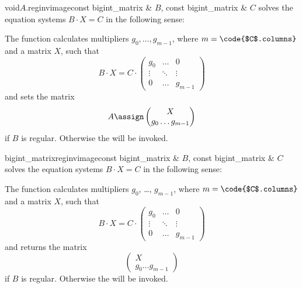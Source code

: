 {\begin{fcode}{void}{$A$.reginvimage}{const bigint_matrix & $B$, const bigint_matrix & $C$}
  solves the equation systems $B \cdot X = C$ in the following sense:

  The function calculates  multipliers $g_0, \dots, g_{m-1}$, where $m =
  \code{$C$.columns}$ and a matrix $X$, such that
  \begin{displaymath}
    B \cdot X = C \cdot \begin{pmatrix}
      g_0 & \dots & 0 \\
      \vdots & \ddots & \vdots \\
      0& \dots & g_{m-1}
    \end{pmatrix}
  \end{displaymath}
  and sets the matrix
  \begin{displaymath}
    A \assign \begin{pmatrix}
      X \\
      g_0 \dots g_{m-1}
    \end{pmatrix}
  \end{displaymath}
  if $B$ is regular.  Otherwise the \LEH will be invoked.
\end{fcode}

\begin{fcode}{bigint_matrix}{reginvimage}{const bigint_matrix & $B$, const bigint_matrix & $C$}
  solves the equation systems $B \cdot X = C$ in the following sense:
  
  The function calculates  multipliers $g_0$, \dots, $g_{m-1}$, where $m =
  \code{$C$.columns}$ and a matrix $X$, such that
  \begin{displaymath}
    B \cdot X = C \cdot \begin{pmatrix}
      g_0 & \dots & 0 \\
      \vdots & \ddots & \vdots \\
      0& \dots & g_{m-1}
    \end{pmatrix}
  \end{displaymath}
  and returns the matrix
  \begin{displaymath}
    \begin{pmatrix}
      X \\
      g_0 \dots g_{m-1}
    \end{pmatrix}
  \end{displaymath}
  if $B$ is regular.  Otherwise the \LEH will be invoked.
\end{fcode}

}
